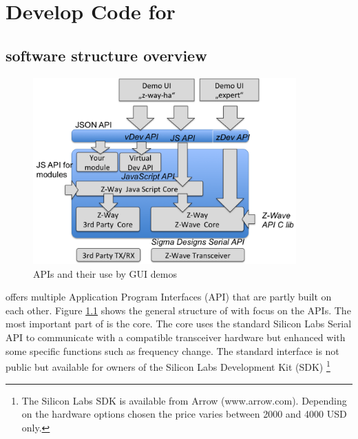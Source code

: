 \chapter{Develop Code for \zway}
\label{c:developer}

\section{\zway software structure overview}

\begin{figure}
\includegraphics[width=0.9\textwidth]{pngs/cap11/apis.png}
\caption{\zway APIs and their use by GUI demos}
\label{apis}
\end{figure}

\zway offers multiple Application Program Interfaces (API) that are partly built on each 
other. Figure \ref{apis} shows the general structure of \zway with focus on the APIs. The 
most important part of \zway is the \zwave core. The \zwave core uses the standard Silicon
Labs Serial API to communicate with a \zwave compatible transceiver hardware but enhanced 
with some \zway specific functions such as frequency change. The standard interface is 
not public but available for owners of the Silicon Labs Development Kit (SDK)
\footnote{The Silicon Labs SDK is available from Arrow (www.arrow.com). Depending 
on the hardware options chosen the price varies between 2000 and 4000 USD only.}

